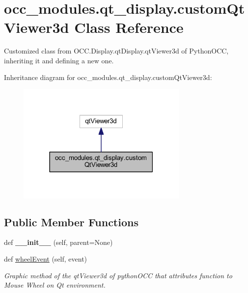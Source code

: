 \hypertarget{a00093}{}\section{occ\+\_\+modules.\+qt\+\_\+display.\+custom\+Qt\+Viewer3d Class Reference}
\label{a00093}


Customized class from O\+C\+C.\+Display.\+qt\+Display.\+qt\+Viewer3d of Python\+O\+CC, inheriting it and defining a new one.  




Inheritance diagram for occ\+\_\+modules.\+qt\+\_\+display.\+custom\+Qt\+Viewer3d\+:
\nopagebreak
\begin{figure}[H]
\begin{center}
\leavevmode
\includegraphics[width=237pt]{a00092}
\end{center}
\end{figure}
\subsection*{Public Member Functions}
\begin{DoxyCompactItemize}
\item 
\hypertarget{a00093_aeef3c40364ac364d1ffc5ba3f5122964}{}\label{a00093_aeef3c40364ac364d1ffc5ba3f5122964} 
def {\bfseries \+\_\+\+\_\+init\+\_\+\+\_\+} (self, parent=None)
\item 
def \hyperlink{a00093_a2031b7d19b3a0c4b0f54fc90218bcdd8}{wheel\+Event} (self, event)
\begin{DoxyCompactList}\small\item\em Graphic method of the qt\+Viewer3d of python\+O\+CC that attributes function to Mouse Wheel on Qt environment. \end{DoxyCompactList}\end{DoxyCompactItemize}


